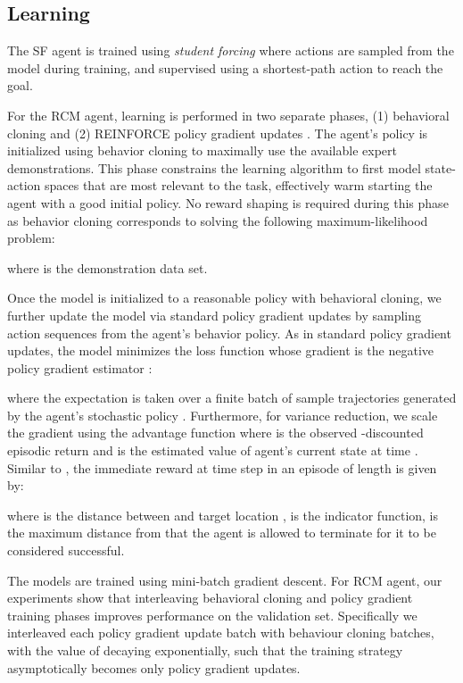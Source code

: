\documentclass[10pt,twocolumn,letterpaper]{article}
\begin{document}
\subsection{Learning}
\label{sec:learning}

The SF agent is trained using \textit{student forcing} \cite{Fried:2018:Speaker} where actions are sampled from the model during training, and supervised using a shortest-path action to reach the goal.

For the RCM agent, learning is performed in two separate phases, (1) behavioral cloning \cite{Bain:1999:Cloning,Wang:2018:RCM,Daftry:2016:TransferablePolicies} and (2) REINFORCE policy gradient updates \cite{Williams:1992:PolicyGradient}. The agent's policy is initialized using behavior cloning to maximally use the available expert demonstrations. This phase constrains the learning algorithm to first model state-action spaces that are most relevant to the task, effectively warm starting the agent with a good initial policy. No reward shaping is required during this phase as behavior cloning corresponds to solving the following maximum-likelihood problem:



\noindent
where  is the demonstration data set.

Once the model is initialized to a reasonable policy with behavioral cloning, we further update the model via standard policy gradient updates by sampling action sequences from the agent's behavior policy. As in standard policy gradient updates, the model minimizes the loss function  whose gradient is the negative policy gradient estimator \cite{Williams:1992:PolicyGradient}:



\noindent
where the expectation  is taken over a finite batch of sample trajectories generated by the agent's stochastic policy . Furthermore, for variance reduction, we scale the gradient using the advantage function  where  is the observed -discounted episodic return and  is the estimated value of agent's current state at time . Similar to \cite{Wang:2018:RCM}, the immediate reward at time step  in an episode of length  is given by:



\noindent
where  is the distance between  and target location ,  is the indicator function,  is the maximum distance from  that the agent is allowed to terminate for it to be considered successful.

The models are trained using mini-batch gradient descent. For RCM agent, our experiments show that interleaving behavioral cloning and policy gradient training phases improves performance on the validation set. Specifically we interleaved each policy gradient update batch with  behaviour cloning batches, with the value of  decaying exponentially, such that the training strategy asymptotically becomes only policy gradient updates.
 
\end{document}
